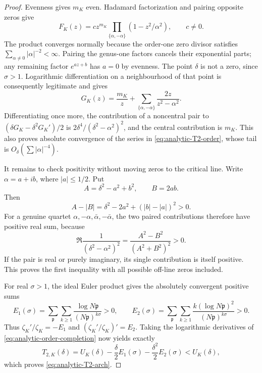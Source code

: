 \begin{proof}
Evenness gives $m_K$ even. Hadamard factorization and pairing
opposite zeros give
\[
 F_K(z)=c z^{m_K}\prod_{\{\alpha,-\alpha\}}
                      (1-z^2/\alpha^2),\qquad c\ne0.
\]
The product converges normally because the order-one zero
divisor satisfies $\sum_{\alpha\ne0}|\alpha|^{-2}<\infty$.
Pairing the genus-one factors cancels their exponential parts;
any remaining factor $e^{az+b}$ has $a=0$ by evenness.
The point $\delta$ is not a zero, since
$\sigma>1$. Logarithmic differentiation on a neighbourhood of
that point is consequently legitimate and gives
\[
 G_K(z)=\frac{m_K}{z}
       +\sum_{\{\alpha,-\alpha\}}
                        \frac{2z}{z^2-\alpha^2}.
\]
Differentiating once more, the contribution of a noncentral
pair to $(\delta G_K-\delta^2G_K')/2$ is
$2\delta^4/(\delta^2-\alpha^2)^2$, and the central contribution
is $m_K$. This also proves absolute convergence of the series
in \eqref{eq:analytic-T2-order}, whose tail is
$O_\delta(\sum |\alpha|^{-4})$.

It remains to check positivity without moving zeros to the
critical line. Write $\alpha=a+ib$, where $|a|\le1/2$. Put
\[
 A=\delta^2-a^2+b^2,\qquad B=2ab.
\]
Then
\[
 A-|B|=\delta^2-2a^2+(|b|-|a|)^2
                    >0.
\]
For a genuine quartet $\alpha,-\alpha,\bar\alpha,-\bar\alpha$,
the two paired contributions therefore have positive real sum,
because
\[
 \Re\frac1{(\delta^2-\alpha^2)^2}
             =\frac{A^2-B^2}{(A^2+B^2)^2}>0.
\]
If the pair is real or purely imaginary, its single contribution
is itself positive. This proves the first inequality with all
possible off-line zeros included.

For real $\sigma>1$, the ideal Euler product gives the absolutely
convergent positive sums
\[
 E_1(\sigma)=\sum_{\mathfrak p}\sum_{k\ge1}
           \frac{\log N\mathfrak p}{(N\mathfrak p)^{k\sigma}}>0,
 \qquad
 E_2(\sigma)=\sum_{\mathfrak p}\sum_{k\ge1}
           \frac{k(\log N\mathfrak p)^2}
                {(N\mathfrak p)^{k\sigma}}>0.
\]
Thus $\zeta_K'/\zeta_K=-E_1$ and
$(\zeta_K'/\zeta_K)'=E_2$. Taking the logarithmic derivatives of
\eqref{eq:analytic-order-completion} now yields exactly
\[
 T_{2,K}(\delta)=U_K(\delta)
                  -\frac\delta2E_1(\sigma)
                  -\frac{\delta^2}2E_2(\sigma)
                  <U_K(\delta),
\]
which proves \eqref{eq:analytic-T2-arch}.
\end{proof}

